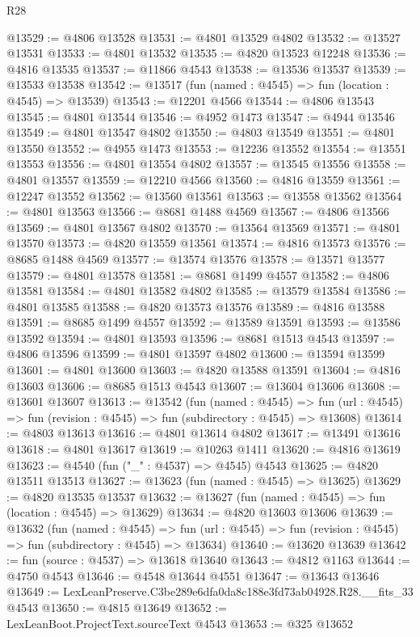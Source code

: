 \begin{lexlean}{R28}
\begin{coremodule}
@13529 := @4806 @13528
@13531 := @4801 @13529 @4802
@13532 := @13527 @13531
@13533 := @4801 @13532
@13535 := @4820 @13523 @12248
@13536 := @4816 @13535
@13537 := @11866 @4543
@13538 := @13536 @13537
@13539 := @13533 @13538
@13542 := @13517 (fun (named : @4545) => fun (location : @4545) => @13539)
@13543 := @12201 @4566
@13544 := @4806 @13543
@13545 := @4801 @13544
@13546 := @4952 @1473
@13547 := @4944 @13546
@13549 := @4801 @13547 @4802
@13550 := @4803 @13549
@13551 := @4801 @13550
@13552 := @4955 @1473
@13553 := @12236 @13552
@13554 := @13551 @13553
@13556 := @4801 @13554 @4802
@13557 := @13545 @13556
@13558 := @4801 @13557
@13559 := @12210 @4566
@13560 := @4816 @13559
@13561 := @12247 @13552
@13562 := @13560 @13561
@13563 := @13558 @13562
@13564 := @4801 @13563
@13566 := @8681 @1488 @4569
@13567 := @4806 @13566
@13569 := @4801 @13567 @4802
@13570 := @13564 @13569
@13571 := @4801 @13570
@13573 := @4820 @13559 @13561
@13574 := @4816 @13573
@13576 := @8685 @1488 @4569
@13577 := @13574 @13576
@13578 := @13571 @13577
@13579 := @4801 @13578
@13581 := @8681 @1499 @4557
@13582 := @4806 @13581
@13584 := @4801 @13582 @4802
@13585 := @13579 @13584
@13586 := @4801 @13585
@13588 := @4820 @13573 @13576
@13589 := @4816 @13588
@13591 := @8685 @1499 @4557
@13592 := @13589 @13591
@13593 := @13586 @13592
@13594 := @4801 @13593
@13596 := @8681 @1513 @4543
@13597 := @4806 @13596
@13599 := @4801 @13597 @4802
@13600 := @13594 @13599
@13601 := @4801 @13600
@13603 := @4820 @13588 @13591
@13604 := @4816 @13603
@13606 := @8685 @1513 @4543
@13607 := @13604 @13606
@13608 := @13601 @13607
@13613 := @13542
    (fun (named : @4545) =>
    fun (url : @4545) => fun (revision : @4545) => fun (subdirectory : @4545) => @13608)
@13614 := @4803 @13613
@13616 := @4801 @13614 @4802
@13617 := @13491 @13616
@13618 := @4801 @13617
@13619 := @10263 @1411
@13620 := @4816 @13619
@13623 := @4540 (fun ("_" : @4537) => @4545) @4543
@13625 := @4820 @13511 @13513
@13627 := @13623 (fun (named : @4545) => @13625)
@13629 := @4820 @13535 @13537
@13632 := @13627 (fun (named : @4545) => fun (location : @4545) => @13629)
@13634 := @4820 @13603 @13606
@13639 := @13632
    (fun (named : @4545) =>
    fun (url : @4545) => fun (revision : @4545) => fun (subdirectory : @4545) => @13634)
@13640 := @13620 @13639
@13642 := fun (source : @4537) => @13618 @13640
@13643 := @4812 @1163
@13644 := @4750 @4543
@13646 := @4548 @13644 @4551
@13647 := @13643 @13646
@13649 := LexLeanPreserve.C3be289e6dfa0da8c188e3fd73ab04928.R28.__fits_33 @4543
@13650 := @4815 @13649
@13652 := LexLeanBoot.ProjectText.sourceText @4543
@13653 := @325 @13652

\end{coremodule}
\end{lexlean}
